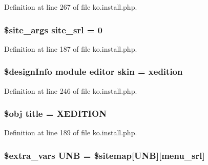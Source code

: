 Definition at line 267 of file ko.\+install.\+php.

\hypertarget{ko_8install_8php_a8b1406b4ad1048041558dce6bfe89004}{}
\subsubsection[{site\+\_\+srl}]{\setlength{\rightskip}{0pt plus 5cm}\$site\+\_\+args site\+\_\+srl = 0}\label{ko_8install_8php_a8b1406b4ad1048041558dce6bfe89004}


Definition at line 187 of file ko.\+install.\+php.

\hypertarget{ko_8install_8php_ab0f2b49fdb57754496b34f6b880cdeaf}{}
\subsubsection[{skin}]{\setlength{\rightskip}{0pt plus 5cm}\$design\+Info {\bf module} {\bf editor} skin = \textquotesingle{}xedition\textquotesingle{}}\label{ko_8install_8php_ab0f2b49fdb57754496b34f6b880cdeaf}


Definition at line 246 of file ko.\+install.\+php.

\hypertarget{ko_8install_8php_a5b072c5fd1d2228c6ba5cee13cd142e3}{}
\subsubsection[{title}]{\setlength{\rightskip}{0pt plus 5cm}\$obj title = \textquotesingle{}X\+E\+D\+I\+T\+I\+O\+N\textquotesingle{}}\label{ko_8install_8php_a5b072c5fd1d2228c6ba5cee13cd142e3}


Definition at line 189 of file ko.\+install.\+php.

\hypertarget{ko_8install_8php_abc0cb1f57d83d4a106f4495c30e0df52}{}
\subsubsection[{U\+N\+B}]{\setlength{\rightskip}{0pt plus 5cm}\${\bf extra\+\_\+vars} U\+N\+B = \$sitemap\mbox{[}\textquotesingle{}U\+N\+B\textquotesingle{}\mbox{]}\mbox{[}\textquotesingle{}menu\+\_\+srl\textquotesingle{}\mbox{]}}\label{ko_8install_8php_abc0cb1f57d83d4a106f4495c30e0df52}


